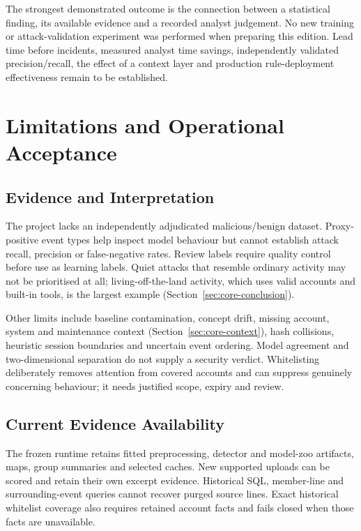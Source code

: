 \documentclass[11pt,a4paper]{article}
\begin{document}
The strongest demonstrated outcome is the connection between a statistical finding, its available evidence and a recorded analyst judgement. No new training or attack-validation experiment was performed when preparing this edition. Lead time before incidents, measured analyst time savings, independently validated precision/recall, the effect of a context layer and production rule-deployment effectiveness remain to be established.

\clearpage
\section{Limitations and Operational Acceptance}

\subsection{Evidence and Interpretation}

The project lacks an independently adjudicated malicious/benign dataset. Proxy-positive event types help inspect model behaviour but cannot establish attack recall, precision or false-negative rates. Review labels require quality control before use as learning labels. Quiet attacks that resemble ordinary activity may not be prioritised at all; living-off-the-land activity, which uses valid accounts and built-in tools, is the largest example (Section~\ref{sec:core-conclusion}).

Other limits include baseline contamination, concept drift, missing account, system and maintenance context (Section~\ref{sec:core-context}), hash collisions, heuristic session boundaries and uncertain event ordering. Model agreement and two-dimensional separation do not supply a security verdict. Whitelisting deliberately removes attention from covered accounts and can suppress genuinely concerning behaviour; it needs justified scope, expiry and review.

\subsection{Current Evidence Availability}

The frozen runtime retains fitted preprocessing, detector and model-zoo artifacts, maps, group summaries and selected caches. New supported uploads can be scored and retain their own excerpt evidence. Historical SQL, member-line and surrounding-event queries cannot recover purged source lines. Exact historical whitelist coverage also requires retained account facts and fails closed when those facts are unavailable.
\end{document}

